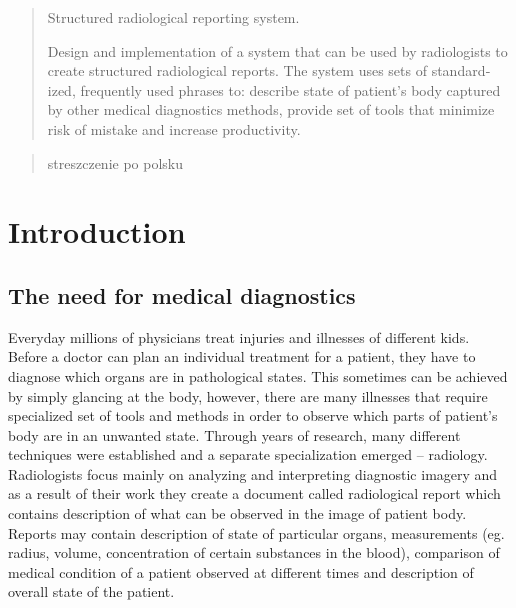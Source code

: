 \documentclass[12pt, twoside, openany]{report}
\theoremstyle{definition}
\begin{document}
\thispagestyle{empty}
\newpage
\pagestyle{headings}
\setcounter{page}{1}
\begin{otherlanguage}{british}
\begin{abstract}
Structured radiological reporting system.

Design and implementation of a system that can be used by radiologists to create structured radiological reports. The system uses sets of standardized, frequently used phrases to: describe state of patient's body captured by other medical diagnostics methods, provide set of tools that minimize risk of mistake and increase productivity. 
\end{abstract}
\end{otherlanguage}

\begin{otherlanguage}{polish}
\begin{abstract}
streszczenie po polsku
\end{abstract}
\end{otherlanguage}

\tableofcontents
\clearpage







\chapter{Introduction}
\section{The need for medical diagnostics}
Everyday millions of physicians treat injuries and illnesses of different kids. Before a doctor can plan an individual treatment for a patient, they have to diagnose which organs are in pathological states\cite{bls}. This sometimes can be achieved by simply glancing at the body, however, there are many illnesses that require specialized set of tools and methods in order to observe which parts of patient's body are in an unwanted state. Through years of research, many different techniques were established and a separate specialization emerged -- radiology. Radiologists focus mainly on analyzing and interpreting diagnostic imagery and as a result of their work they create a document called radiological report which contains description of what can be observed in the image of patient body. Reports may contain description of state of particular organs, measurements (eg. radius, volume, concentration of certain substances in the blood), comparison of medical condition of a patient observed at different times and description of overall state of the patient. \\
\end{document}
